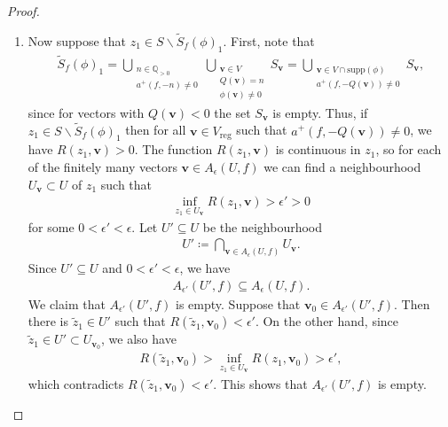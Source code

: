 \documentclass[10pt,a4paper]{amsart}
\newcommand{\Q}{\mathbb{Q}}
\newcommand{\Stil}{\widetilde{S}}
\newcommand{\reg}{\mathrm{reg}}
\newcommand{\supp}{\mathrm{supp}}
\newcommand{\vbf}{\mathbf{v}}
\begin{document}
\begin{proof}
\begin{enumerate}
\item Now suppose that $z_1 \in S \smallsetminus \Stil_f(\phi)_1$. First, note that
\begin{align}
\Stil_f(\phi)_1 = \bigcup_{\substack{ n \in \Q_{>0} \\ a^+(f,-n) \neq 0}} \bigcup_{\substack{ \vbf \in  V \\ Q(\vbf)=n \\ \phi (\vbf) \neq 0}} S_\vbf = \bigcup_{\substack{ \vbf \in V \cap \supp(\phi) \\ a^+(f,-Q(\vbf)) \neq 0}} S_\vbf,
\end{align}
since for vectors with $Q(\vbf)<0$ the set $S_\vbf$ is empty.  Thus, if $z_1 \in S \smallsetminus \Stil_f(\phi)_1$ then for all $\vbf \in V_\reg$ such that $a^+(f,-Q(\vbf)) \neq 0$, we have $R(z_1,\vbf)>0$. The function $R(z_1,\vbf)$ is continuous in $z_1$, so for each of the finitely many vectors $\vbf \in A_\epsilon(U,f)$ we can find a neighbourhood $U_\vbf \subset U$ of $z_1$ such that 
\begin{align}
\inf_{z_1 \in U_\vbf} R(z_1,\vbf)> \epsilon'>0
\end{align}
for some $0<\epsilon' <\epsilon$. Let $U' \subseteq U$ be the neighbourhood
\begin{align}
U' \coloneqq \bigcap_{\vbf \in A_\epsilon(U,f)} U_\vbf.
\end{align}  Since $U' \subseteq U$ and $0<\epsilon' <\epsilon$, we have
\begin{align}
A_{\epsilon'}(U',f) \subseteq A_\epsilon(U,f).
\end{align}
We claim that $A_{\epsilon'}(U',f)$ is empty. Suppose that $\vbf_0 \in A_{\epsilon'}(U',f)$. Then there is $\tilde{z}_1 \in U'$ such that $R(\tilde{z}_1,\vbf_0)<\epsilon'$. On the other hand, since $\tilde{z}_1 \in U' \subset U_{\vbf_0}$, we also have
\begin{align}
R(\tilde{z}_1,\vbf_0)>\inf_{z_1 \in U_\vbf} R(z_1,\vbf_0)> \epsilon',
\end{align}
which contradicts $R(\tilde{z}_1,\vbf_0)<\epsilon'$. This shows that $A_{\epsilon'}(U',f)$ is empty.
\end{enumerate}
\end{proof}
\end{document}
